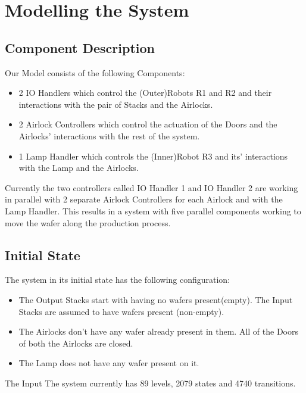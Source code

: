 \documentclass[a4paper,12pt]{article}
\begin{document}
	\newpage
	\section{Modelling the System}
	\subsection{Component Description}
	Our Model consists of the following Components:
	\begin{itemize}
		\item 2 IO Handlers which control the (Outer)Robots R1 and R2 and their interactions with the pair of Stacks and the Airlocks.
		\item 2 Airlock Controllers which control the actuation of the Doors and the Airlocks' interactions with the rest of the system.
		\item 1 Lamp Handler which controls the (Inner)Robot R3 and its' interactions with the Lamp and the Airlocks.
	\end{itemize}
	Currently the two controllers called IO Handler 1 and IO Handler 2 are working in parallel with 2 separate Airlock Controllers for each Airlock and with the Lamp Handler. This results in a system with five parallel components working to move the wafer along the production process. 
	\subsection{Initial State}
	The system in its initial state has the following configuration:
	\begin{itemize}
		\item The Output Stacks start with having no wafers present(empty). The Input Stacks are assumed to have wafers present (non-empty).
		\item The Airlocks don't have any wafer already present in them. All of the Doors of both the Airlocks are closed.
		\item The Lamp does not have any wafer present on it.
	\end{itemize} 
	The Input The system currently has 89 levels, 2079 states and 4740 transitions.
\end{document}
